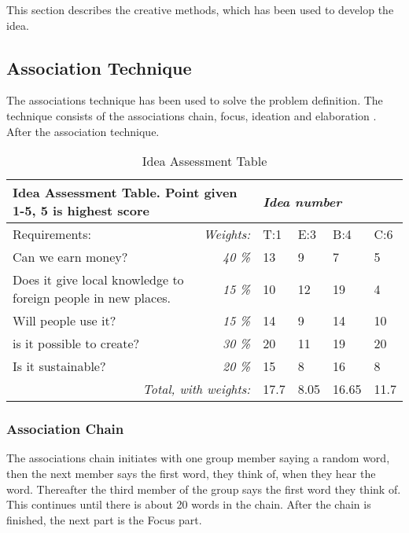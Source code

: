
This section describes the creative methods, which has been used to develop the idea.

\subsection{Association Technique}
The associations technique has been used to solve the problem definition. The technique consists of the associations chain, focus, ideation and elaboration . After the association technique. 

\begin{table*}[t!]
\centering
\caption{Idea Assessment Table}
\label{tab:iass}
\begin{tabular}{|l|r|l|l|l|l|}
\hline
\multicolumn{2}{|l|}{\textbf{Idea Assessment Table. Point given 1-5, 5 is highest score}} & \multicolumn{4}{l|}{\textit{Idea number}} \\ \hline
Requirements: & \multicolumn{1}{l|}{\textit{Weights:}} & T:1 & E:3 & B:4 & C:6 \\ \hline
Can we earn money? & \textit{40 \%} & 13 & 9 & 7 & 5 \\ \hline
Does it give local knowledge to foreign people in new places. & \textit{15 \%} & 10 & 12 & 19 & 4 \\ \hline
Will people use it? & \textit{15 \%} & 14 & 9 & 14 & 10 \\ \hline
is it possible to create? & \textit{30 \%} & 20 & 11 & 19 & 20 \\ \hline
Is it sustainable? & \textit{20 \%} & 15 & 8 & 16 & 8 \\ \hline
\multicolumn{2}{|r|}{\textit{Total, with weights:}} & \cellcolor[HTML]{9AFF99}17.7 & \cellcolor[HTML]{FD6864}8.05 & \cellcolor[HTML]{FFFC9E}16.65 & \cellcolor[HTML]{FD6864}11.7 \\ \hline
\end{tabular}
\end{table*}

\subsubsection{Association Chain}
The associations chain initiates with one group member saying a random word, then the next member says the first word, they think of, when they hear the word. Thereafter the third member of the group says the first word they think of. This continues until there is about 20 words in the chain. After the chain is finished, the next part is the Focus part.

